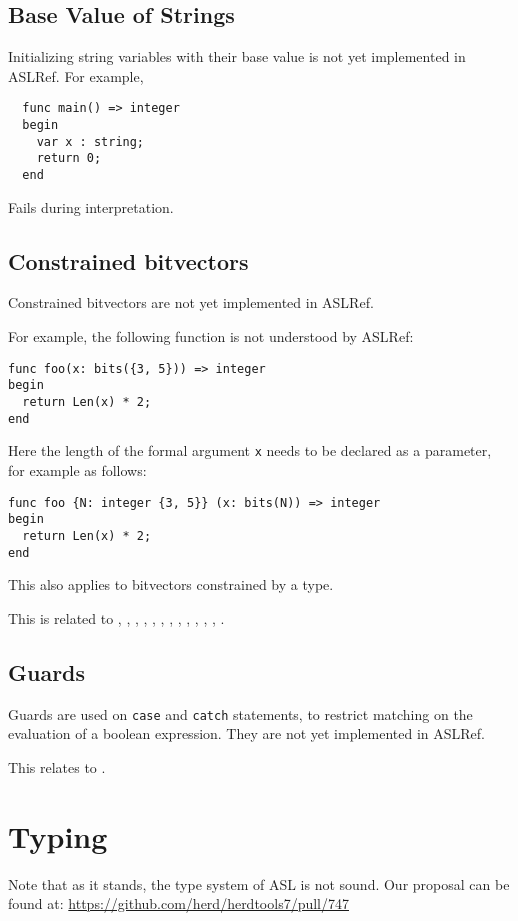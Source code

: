 \documentclass{book}
\begin{document}
\subsection{Base Value of Strings}
Initializing string variables with their base value is not yet implemented in ASLRef.
For example,
\begin{Verbatim}
  func main() => integer
  begin
    var x : string;
    return 0;
  end
\end{Verbatim}
Fails during interpretation.\subsection{Constrained bitvectors}
Constrained bitvectors are not yet implemented in ASLRef.

For example, the following function is not understood by ASLRef:
\begin{Verbatim}
func foo(x: bits({3, 5})) => integer
begin
  return Len(x) * 2;
end
\end{Verbatim}
%
Here the length of the formal argument \Verb|x| needs to be declared as a
parameter, for example as follows:
\begin{Verbatim}
func foo {N: integer {3, 5}} (x: bits(N)) => integer
begin
  return Len(x) * 2;
end
\end{Verbatim}
%
This also applies to bitvectors constrained by a type.

This is related to , , , ,
, , , , ,
, , , .

\subsection{Guards}

Guards are used on \texttt{case} and \texttt{catch} statements, to restrict
matching on the evaluation of a boolean expression.
%
They are not yet implemented in ASLRef.

This relates to .

\section{Typing}

Note that as it stands, the type system of ASL is not sound.
Our proposal can be found at:
\url{https://github.com/herd/herdtools7/pull/747}
\end{document}
